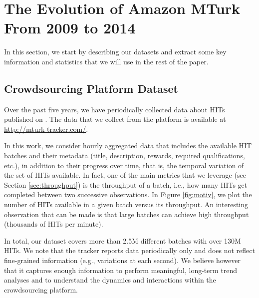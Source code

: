 \section{The Evolution of Amazon MTurk From 2009 to 2014}
\label{sec:stats}

In this section, we start by describing our datasets and extract some key information and statistics that we will use in the rest of the paper.

\subsection{Crowdsourcing Platform Dataset}
\label{sec:tracker}
Over the past five years, we have periodically collected data about HITs published on \amt{}.
The data that we collect from the platform is available at \url{http://mturk-tracker.com/}. 

In this work, we consider hourly aggregated data that includes the available HIT batches and their metadata (title, description, rewards, required qualifications, etc.), in addition to their progress over time, that is, the temporal variation of the set of HITs available. In fact, one of the main metrics that we leverage (see Section \ref{sec:throughput}) is the throughput of a batch, i.e., how many HITs get completed between two successive observations. In Figure \ref{fig:motiv}, we plot the number of HITs available in a given batch versus its throughput. An interesting observation that can be made is that large batches can achieve high throughput (thousands of HITs per minute).

In total, our dataset covers more than 2.5M different batches with over 130M HITs.
We note that the tracker reports data periodically only and does not reflect fine-grained information (e.g., variations at each second). We believe however that it captures enough information to perform meaningful, long-term trend analyses and to understand the dynamics and interactions within the crowdsourcing platform.\\

